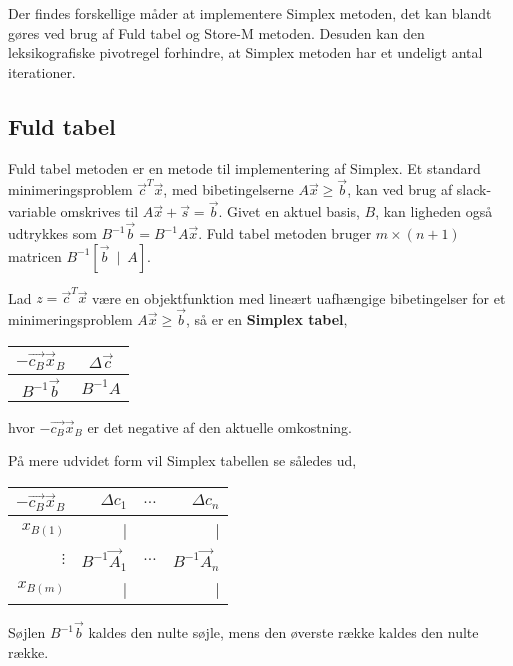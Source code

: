 Der findes forskellige måder at implementere Simplex metoden, det kan blandt gøres ved brug af Fuld tabel og Store-M metoden. Desuden kan den leksikografiske pivotregel forhindre, at Simplex metoden har et undeligt antal iterationer. 

\subsection{Fuld tabel}
Fuld tabel metoden er en metode til implementering af Simplex. Et standard minimeringsproblem $\vec{c}^T\vec{x}$, med bibetingelserne $A\vec{x} \geq \vec{b}$, kan ved brug af slack-variable omskrives til $A\vec{x}+\vec{s}=\vec{b}$. Givet en aktuel basis, $B$, kan ligheden også udtrykkes som  $B^{-1}\vec{b}=B^{-1}A\vec{x}$. Fuld tabel metoden bruger $m \times (n+1)$ matricen $B^{-1}[\vec{b} \ \mid \ A]$.\\

\begin{defn}
Lad $z=\vec{c}^T\vec{x}$ være en objektfunktion med lineært uafhængige bibetingelser for et minimeringsproblem $A\vec{x} \geq \vec{b}$, så er en \textbf{Simplex tabel},\\
\begin{center}
\begin{tabular}{| c | c |}
  \hline
  $-\vec{c_B}\vec{x}_B$&$\Delta\vec{c}$ \\ \hline			
  $B^{-1}\vec{b}$ & $B^{-1}A$ \\ \hline
\end{tabular}
\end{center}
hvor $-\vec{c_B}\vec{x}_B$ er det negative af den aktuelle omkostning. 
\end{defn}


På mere udvidet form vil Simplex tabellen se således ud,
\begin{center}
\begin{tabular}{| r|r r r|}
  \hline	
  $-\vec{c_B}\vec{x}_B$&$\Delta c_1 $ & $\dots$ &$\Delta c_n$\\ \hline	
  $x_{B(1)}$ &	| & & |\\	
  $\vdots$  & $B^{-1}\vec{A}_1$ & $\hdots$ & $B^{-1}\vec{A}_n$\\
   $x_{B(m)}$ &	| & & |\\
   \hline
\end{tabular}
\end{center}
Søjlen $B^{-1}\vec{b}$ kaldes den nulte søjle, mens den øverste række kaldes den nulte række.

